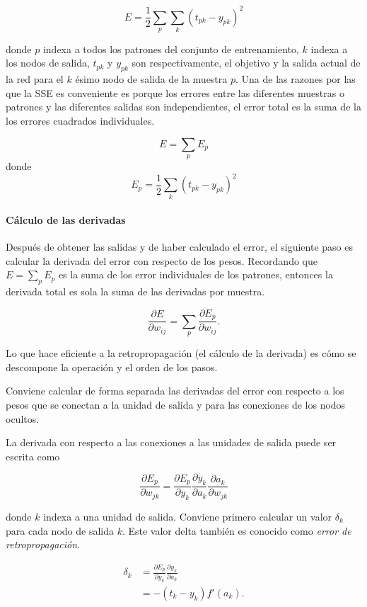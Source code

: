 \[
E = \frac{1}{2} \sum_p\sum_k(t_{pk} - y_{pk})^2
\]

donde $p$ indexa a todos los patrones del conjunto de entrenamiento, $k$ indexa a
los nodos de salida, $t_{pk}$ y $y_{pk}$ son respectivamente, el objetivo y la salida actual de la red para el
$k$ ésimo nodo de salida de la muestra $p$.
Una de las razones por las que la SSE es conveniente es porque los errores entre las diferentes
muestras o patrones y las diferentes salidas son independientes, el error
total es la suma de la los errores cuadrados individuales.

\[
E = \sum_p E_p
\]
donde 
\[
E_p = \frac{1}{2} \sum_k (t_{pk} - y_{pk})^2
\]

\paragraph{Cálculo de las derivadas}
Después de obtener las salidas y de haber calculado el error, el siguiente paso es
calcular la derivada del error con respecto de los pesos. Recordando que $E = \sum_p E_p$
es la suma de los error individuales de los patrones, entonces la derivada total
es sola la suma de las derivadas por muestra.

\[
\frac{\partial E}{\partial w_{ij}} = \sum_p \frac{\partial E_p}{\partial w_{ij}}.    
\]


Lo que hace eficiente a la retropropagación (el cálculo de la derivada) es cómo se descompone la operación 
y el orden de los pasos. 

Conviene calcular de forma separada las derivadas del error
con respecto a los pesos que se conectan a la unidad de salida
y para las conexiones de los nodos ocultos.

La derivada con respecto a las conexiones a las unidades de salida puede ser escrita como

\begin{equation}\label{eq:derivative-output}
    \frac{\partial E_p}{\partial w_{jk}} = \frac{\partial E_p}{\partial y_k}\frac{\partial y_k}{\partial a_k} \frac{\partial a_{k}}{\partial w_{jk}}
\end{equation}

donde $k$ indexa a una unidad de salida. Conviene primero calcular un valor
$\delta_k$ para cada nodo de salida $k$. Este valor delta también es conocido
como \textit{error de retropropagación}.

\begin{align*}
\delta_k &= \frac{\partial E_p}{\partial y_k}\frac{\partial y_k}{\partial a_k} \\
&= -(t_k - y_k) f'(a_k).
\end{align*}

